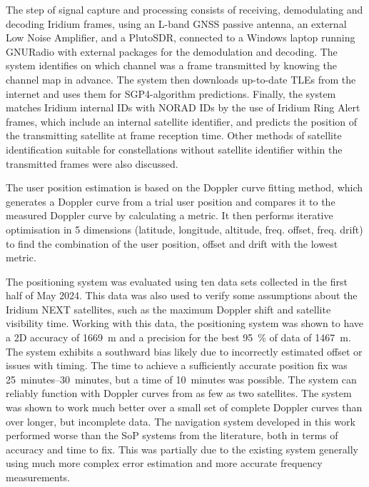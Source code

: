 The step of signal capture and processing consists of receiving, demodulating and decoding Iridium frames, using an L-band GNSS passive antenna, an external Low Noise Amplifier, and a PlutoSDR, connected to a Windows laptop running GNURadio with external packages for the demodulation and decoding. The system identifies on which channel was a frame transmitted by knowing the channel map in advance. The system then downloads up-to-date TLEs from the internet and uses them for SGP4-algorithm predictions. Finally, the system matches Iridium internal IDs with NORAD IDs by the use of Iridium Ring Alert frames, which include an internal satellite identifier, and predicts the position of the transmitting satellite at frame reception time. Other methods of satellite identification suitable for constellations without satellite identifier within the transmitted frames were also discussed.

The user position estimation is based on the Doppler curve fitting method, which generates a Doppler curve from a trial user position and compares it to the measured Doppler curve by calculating a metric. It then performs iterative optimisation in 5 dimensions (latitude, longitude, altitude, freq. offset, freq. drift) to find the combination of the user position, offset and drift with the lowest metric.

The positioning system was evaluated using ten data sets collected in the first half of May 2024. This data was also used to verify some assumptions about the Iridium NEXT satellites, such as the maximum Doppler shift and satellite visibility time. Working with this data, the positioning system was shown to have a 2D accuracy of \qty{1669}{m} and a precision for the best \qty{95}{\percent} of data of \qty{1467}{m}. The system exhibits a southward bias likely due to incorrectly estimated offset or issues with timing. The time to achieve a sufficiently accurate position fix was \qtyrange{25}{30}{minutes}, but a time of \qty{10}{minutes} was possible. The system can reliably function with Doppler curves from as few as two satellites. The system was shown to work much better over a small set of complete Doppler curves than over longer, but incomplete data. The navigation system developed in this work performed worse than the SoP systems from the literature,
both in terms of accuracy and time to fix. This was partially due to the existing system generally using much more complex error estimation and more accurate frequency measurements.

